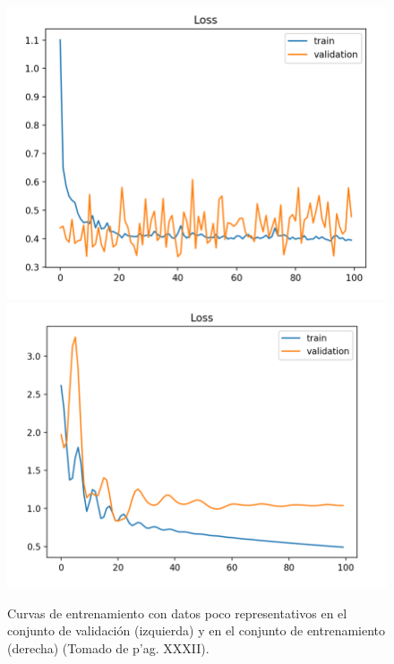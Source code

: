 \begin{figure}[h!]
	\begin{center}
		\begin{center}
			\includegraphics[scale=.3]{Graphics/unrepresentative_dev_set.png}
			\includegraphics[scale=.3]{Graphics/unrepresentative_train_set.png}
        \end{center}
	    \caption{Curvas de entrenamiento con datos poco representativos en el conjunto de validación (izquierda) 
		y en el conjunto de entrenamiento (derecha) (Tomado de \cite{brownlee2018better} p'ag. XXXII).}\label{fig:unrepresentative_data}
	\end{center}
\end{figure}

